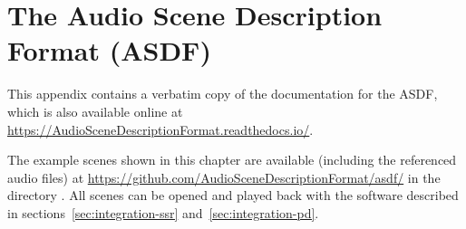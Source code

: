 \chapter{The Audio Scene Description Format (ASDF)}
\label{sec:asdf}

This appendix contains a verbatim copy of the documentation for the ASDF,
which is also available online at
\url{https://AudioSceneDescriptionFormat.readthedocs.io/}.

The example scenes shown in this chapter are available
(including the referenced audio files)
at \url{https://github.com/AudioSceneDescriptionFormat/asdf/}
in the directory .
All scenes can be opened and played back with the software
described in sections~\ref{sec:integration-ssr} and~\ref{sec:integration-pd}.


